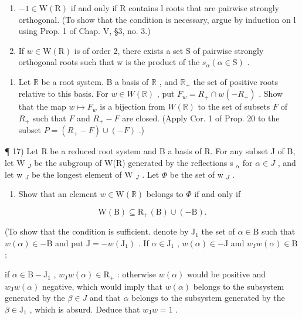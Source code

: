 \begin{enumerate}
\def\labelenumi{\alph{enumi})}
\item
  \(-1 \in \mathrm{W}(\mathrm{R})\) if and only if R contains l roots that are pairwise strongly orthogonal. (To show that the condition is necessary, argue by induction on l using Prop. 1 of Chap. V, §3, no. 3.)
\item
  If \(w \in \mathrm{W}(\mathrm{R})\) is of order 2, there exists a set S of pairwise strongly orthogonal roots such that w is the product of the \(s_{\alpha} (\alpha \in \mathrm{S})\) .
\end{enumerate}

\begin{enumerate}
\def\labelenumi{\arabic{enumi})}
\setcounter{enumi}{15}
\tightlist
\item
  Let \(\mathbb{R}\) be a root system. B a basis of \(\mathbb{R}\) , and \(\mathbb{R}_+\) the set of positive roots relative to this basis. For \(w \in W(\mathbb{R})\) , put \(F_w = R_+ \cap w(-R_+)\) . Show that the map \(w \mapsto F_w\) is a bijection from \(W(\mathbb{R})\) to the set of subsets \(F\) of \(R_+\) such that \(F\) and \(R_+ - F\) are closed. (Apply Cor. 1 of Prop. 20 to the subset \(P = (R_+ - F) \cup (-F)\) .)
\end{enumerate}

¶ 17) Let R be a reduced root system and B a basis of R. For any subset J of B, let W \(_{J}\) be the subgroup of W(R) generated by the reflections s \(_{\alpha}\) for \(\alpha \in J\) , and let w \(_{J}\) be the longest element of W \(_{J}\) . Let \(\Phi\) be the set of w \(_{J}\) .

\begin{enumerate}
\def\labelenumi{\alph{enumi})}
\tightlist
\item
  Show that an element \(w \in \mathrm{W}(\mathbb{R})\) belongs to \(\Phi\) if and only if
\end{enumerate}

\[
\mathrm{W} (\mathrm{B}) \subseteq \mathrm{R} _ {+} (\mathrm{B}) \cup (- \mathrm{B}).
\]

(To show that the condition is sufficient. denote by \(\mathrm{J}_1\) the set of \(\alpha \in \mathrm{B}\) such that \(w(\alpha) \in -\mathrm{B}\) and put \(\mathrm{J} = -w(\mathrm{J}_1)\) . If \(\alpha \in \mathrm{J}_1\) , \(w(\alpha) \in -\mathrm{J}\) and \(w_{\mathrm{J}}w(\alpha) \in \mathrm{B}\) ;

if \(\alpha \in \mathrm{B} - \mathrm{J}_1\) , \(w_{\mathrm{J}}w(\alpha) \in \mathrm{R}_{+}\) : otherwise \(w(\alpha)\) would be positive and \(w_{\mathrm{J}}w(\alpha)\) negative, which would imply that \(w(\alpha)\) belongs to the subsystem generated by the \(\beta \in J\) and that \(\alpha\) belongs to the subsystem generated by the \(\beta \in \mathrm{J}_1\) , which is absurd. Deduce that \(w_{\mathrm{J}}w = 1\) .


